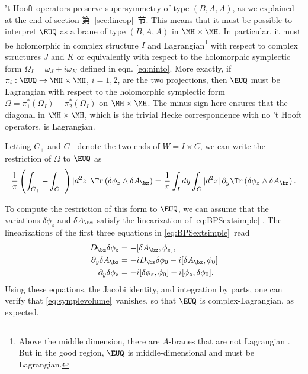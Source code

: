 't Hooft operators preserve supersymmetry of type $(B,A,A)$, as we
explained at the end of section 第~\ref{sec:lineop}~节.  This means that it must
be possible to interpret ${\EUQ}$ as a brane of type $(B,A,A)$ in
$\MH\times \MH$.  In particular, it must be holomorphic in complex
structure $I$ and Lagrangian\footnote{Above the middle dimension,
there are $A$-branes that are not Lagrangian \cite{ref80}. But in the
good region, ${\EUQ}$ is middle-dimensional and must be
Lagrangian.} with respect to complex structures $J$ and $K$ or
equivalently with respect to the holomorphic symplectic form
$\Omega_I=\omega_J+i\omega_K$ defined in eqn. \eqref{eq:ninto}.  More
exactly, if $\pi_i:{\EUQ}\to\MH\times\MH$, $i=1,2$, are the two
projections, then ${\EUQ}$ must be Lagrangian with respect to the
holomorphic symplectic form
$\Omega=\pi_1^*(\Omega_I)-\pi_2^*(\Omega_I)$ on $\MH\times \MH$.
The minus sign here ensures that the diagonal in $\MH\times \MH$,
which is the trivial Hecke correspondence with no 't Hooft
operators, is Lagrangian.

Letting $C_+$ and $C_-$ denote the two ends of $W=I\times C$, we
can write the restriction of $\Omega$ to ${\EUQ}$ as
\setcounter{equation}{40}
\begin{equation}\label{eq:symplevolume}
{1\over\pi}\left(\int_{C_+}
-\int_{C_-}\right)|d^2 z|\,\Tr\left(\delta\phi_z\wedge \delta
A_\bz\right)={1\over \pi}\int_Idy\int_C|d^2z|\,
\partial_y \Tr\left(\delta\phi_z\wedge\delta A_\bz\right).
\end{equation}

To compute the restriction of this form to $\EUQ$, we can assume
that the variations $\delta\phi_z$ and $\delta A_\bz$ satisfy the
linearization of \eqref{eq:BPSextsimple} . The linearizations of the first
three equations in \eqref{eq:BPSextsimple}\ read
\setcounter{equation}{41}
\begin{equation}\label{eq:BPSlin}
\begin{aligned}D_\bz\delta\phi_z&=-[\delta
A_\bz,\phi_z],\\
\partial_y\delta A_\bz&=-iD_\bz\delta\phi_0 - i [\delta
A_\bz,\phi_0]\\
\partial_y\delta\phi_z&=-i[\delta\phi_z,\phi_0]-i[\phi_z,\delta\phi_0]
.\\\end{aligned}
\end{equation}
 Using these equations, the Jacobi identity, and integration
by parts, one can verify that \eqref{eq:symplevolume}\ vanishes, so that
${\EUQ}$ is complex-Lagrangian, as expected.
